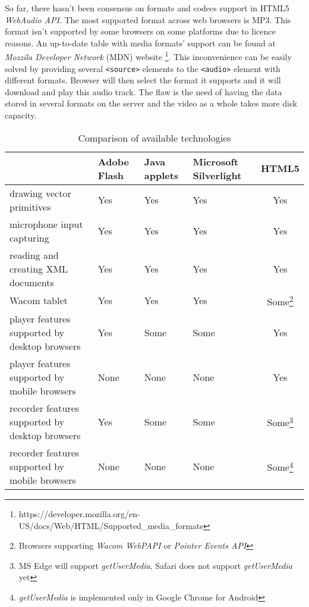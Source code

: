 So far, there hasn't been consensus on formats and codecs support in HTML5 \textit{WebAudio API}. The most supported format across web browsers is MP3. This format isn't supported by some browsers on some platforms due to licence reasons. An up-to-date table with media formats' support can be found at \textit{Mozzila Developer Network} (MDN) website  \cite{} \footnote{https://developer.mozilla.org/en-US/docs/Web/HTML/Supported\_media\_formats}. This inconvenience can be easily solved by providing several \verb|<source>| elements to the \verb|<audio>| element with different formats. Browser will then select the format it supports and it will download and play this audio track. The flaw is the need of having the data stored in several formats on the server and the video as a whole takes more disk capacity.

\vfill

\begin{savenotes}
	\begin{table}[ht]

		\begin{tabular}{L{3.7cm}C{2.3cm}C{2.3cm}C{2.3cm}c}

		\hline
		& \textbf{Adobe Flash} 		& \textbf{Java applets} 			& \textbf{Microsoft Silverlight} 				& \textbf{HTML5}  \\ \hline


		drawing vector primitives			
			& Yes	& Yes	& Yes	& Yes	 \\ \hline
		microphone input capturing			
			& Yes	& Yes	& Yes	& Yes	 \\ \hline
		reading and creating XML documents	
			& Yes	& Yes	& Yes	& Yes	 \\ \hline
		Wacom tablet						
			& Yes	& Yes	& Yes	& Some\footnote{Browsers supporting \textit{Wacom WebPAPI} or \textit{Pointer Events API}} \\ \hline
		
		player features supported by desktop browsers	
			& Yes
			& Some
			& Some
			& Yes \\ \hline
		player features supported by mobile browsers
			& None
			& None
			& None
			& Yes \\ \hline
		recorder features supported by desktop browsers	
			& Yes
			& Some
			& Some
			& Some\footnote{MS Edge will support \textit{getUserMedia}, Safari does not support \textit{getUserMedia} yet} \\ \hline
		recorder features supported by mobile browsers	
			& None
			& None
			& None
			& Some\footnote{\textit{getUserMedia} is implemented only in Google Chrome for Android} \\ \hline

		\hline

		\end{tabular}
		\caption{Comparison of available technologies}
		\label{tbl:comparsion_of_matechnologies}
	\end{table}
\end{savenotes}



